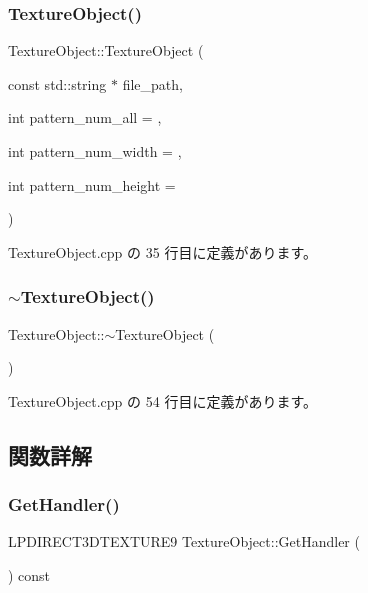 \subsubsection{\texorpdfstring{Texture\+Object()}{TextureObject()}}
{\footnotesize\ttfamily Texture\+Object\+::\+Texture\+Object (\begin{DoxyParamCaption}\item[{const std\+::string $\ast$}]{file\+\_\+path,  }\item[{int}]{pattern\+\_\+num\+\_\+all = {},  }\item[{int}]{pattern\+\_\+num\+\_\+width = {},  }\item[{int}]{pattern\+\_\+num\+\_\+height = {} }\end{DoxyParamCaption})}



 Texture\+Object.\+cpp の 35 行目に定義があります。

\mbox{\label{class_texture_object_aeed25fa5ca8e892b96145f4a649e090a}} 
\subsubsection{\texorpdfstring{$\sim$\+Texture\+Object()}{~TextureObject()}}
{\footnotesize\ttfamily Texture\+Object\+::$\sim$\+Texture\+Object (\begin{DoxyParamCaption}{ }\end{DoxyParamCaption})\hspace{0.3cm}{\ttfamily [virtual]}}



 Texture\+Object.\+cpp の 54 行目に定義があります。



\subsection{関数詳解}
\mbox{\label{class_texture_object_a1b6c93f36e03686f7198b93355c73c8a}} 
\subsubsection{\texorpdfstring{Get\+Handler()}{GetHandler()}}
{\footnotesize\ttfamily L\+P\+D\+I\+R\+E\+C\+T3\+D\+T\+E\+X\+T\+U\+R\+E9 Texture\+Object\+::\+Get\+Handler (\begin{DoxyParamCaption}{ }\end{DoxyParamCaption}) const\hspace{0.3cm}{\ttfamily [inline]}}



